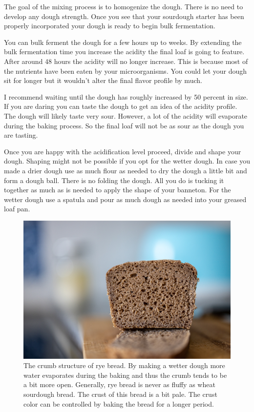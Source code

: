 The goal of the mixing process is to homogenize the dough. There
is no need to develop any dough strength. Once you see that
your sourdough starter has been properly incorporated your
dough is ready to begin bulk fermentation.

You can bulk ferment the dough for a few hours up to
weeks. By extending the bulk fermentation time you increase
the acidity the final loaf is going to feature. After around
48 hours the acidity will no longer increase. This is because
most of the nutrients have been eaten by your microorganisms.
You could let your dough sit for longer but it wouldn't alter the
final flavor profile by much.

I recommend waiting until the dough has roughly increased by
50 percent in size. If you are daring you can taste the dough
to get an idea of the acidity profile. The dough will likely
taste very sour. However, a lot of the acidity will evaporate
during the baking process. So the final loaf will not be
as sour as the dough you are tasting.

Once you are happy with the acidification level proceed, divide
and shape your dough. Shaping might not be possible if you opt
for the wetter dough. In case you made a drier dough use as much
flour as needed to dry the dough a little bit and form a dough ball.
There is no folding the dough. All you do is tucking it together
as much as is needed to apply the shape of your banneton.
For the wetter dough use a spatula and pour as much dough as
needed into your greased loaf pan.

\begin{figure}[!htb]
  \includegraphics[width=\textwidth]{crumb}
  \caption{The crumb structure of rye bread. By making a wetter
  dough more water evaporates during the baking and thus the
  crumb tends to be a bit more open. Generally, rye
  bread is never as fluffy as wheat sourdough bread. The crust
  of this bread is a bit pale. The crust color can be controlled
  by baking the bread for a longer period.}
  \label{fig:rye-crumb}
\end{figure}

